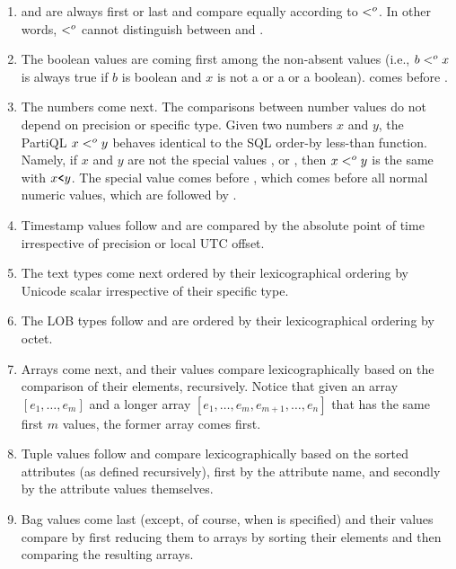 \begin{enumerate}
\item {} and  are always first or last and compare equally
according to $<^o$. In other words, $<^o$ cannot distinguish between
 and .
\item The boolean values are coming first among the non-absent values (i.e., $b
<^o x$ is always true if $b$ is boolean and $x$ is not a  or a
 or a boolean).   comes before .
\item The numbers come next. The comparisons between number values do not depend
on precision or specific type. Given two numbers $x$ and $y$, the PartiQL $x
<^o y$ behaves identical to the SQL order-by less-than function. Namely, if
$x$ and $y$ are not the special values ,  or ,
then $x <^o y$ is the same with $x \texttt{\textbf{<}} y$. The special value 
comes before , which comes before all normal numeric values, which
are followed by .
\item Timestamp values follow and are compared by the absolute point of time
irrespective of precision or local UTC offset.
\item The text types come next ordered by their lexicographical ordering by
Unicode scalar irrespective of their specific type.
\item The LOB types follow and are ordered by their lexicographical ordering by
octet.
\item Arrays come next, and their values compare lexicographically based on the
comparison of their elements, recursively. Notice that given an array $[e_1,
\ldots, e_m]$ and a longer array $[e_1, \ldots, e_m, e_{m+1}, \ldots, e_n]$ that
has the same first $m$ values, the former array comes first.
\item Tuple values follow and compare lexicographically based on the sorted
attributes (as defined recursively), first by the attribute name, and secondly
by the attribute values themselves.
\item Bag values come last (except, of course, when  is
specified) and their values compare by first reducing them to arrays by sorting
their elements and then comparing the resulting arrays.
\end{enumerate}

